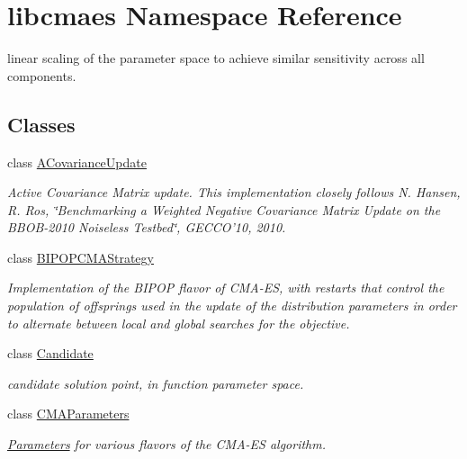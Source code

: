 \hypertarget{namespacelibcmaes}{\section{libcmaes Namespace Reference}
\label{namespacelibcmaes}
}


linear scaling of the parameter space to achieve similar sensitivity across all components.  


\subsection*{Classes}
\begin{DoxyCompactItemize}
\item 
class \hyperlink{classlibcmaes_1_1ACovarianceUpdate}{A\-Covariance\-Update}
\begin{DoxyCompactList}\small\item\em Active Covariance Matrix update. This implementation closely follows N. Hansen, R. Ros, \char`\"{}\-Benchmarking a Weighted Negative Covariance Matrix 
                           Update on the B\-B\-O\-B-\/2010 Noiseless Testbed\char`\"{}, G\-E\-C\-C\-O'10, 2010. \end{DoxyCompactList}\item 
class \hyperlink{classlibcmaes_1_1BIPOPCMAStrategy}{B\-I\-P\-O\-P\-C\-M\-A\-Strategy}
\begin{DoxyCompactList}\small\item\em Implementation of the B\-I\-P\-O\-P flavor of C\-M\-A-\/\-E\-S, with restarts that control the population of offsprings used in the update of the distribution parameters in order to alternate between local and global searches for the objective. \end{DoxyCompactList}\item 
class \hyperlink{classlibcmaes_1_1Candidate}{Candidate}
\begin{DoxyCompactList}\small\item\em candidate solution point, in function parameter space. \end{DoxyCompactList}\item 
class \hyperlink{classlibcmaes_1_1CMAParameters}{C\-M\-A\-Parameters}
\begin{DoxyCompactList}\small\item\em \hyperlink{classlibcmaes_1_1Parameters}{Parameters} for various flavors of the C\-M\-A-\/\-E\-S algorithm. \end{DoxyCompactList}\item 

\end{DoxyCompactItemize}
